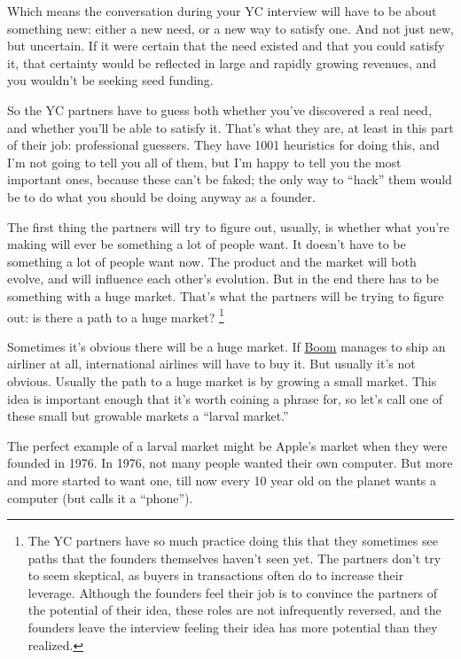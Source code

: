 Which means the conversation during your YC interview will have to be
about something new: either a new need, or a new way to satisfy one. And
not just new, but uncertain. If it were certain that the need existed
and that you could satisfy it, that certainty would be reflected in
large and rapidly growing revenues, and you wouldn't be seeking seed
funding.

So the YC partners have to guess both whether you've discovered a real
need, and whether you'll be able to satisfy it. That's what they are, at
least in this part of their job: professional guessers. They have 1001
heuristics for doing this, and I'm not going to tell you all of them,
but I'm happy to tell you the most important ones, because these can't
be faked; the only way to ``hack'' them would be to do what you should
be doing anyway as a founder.

The first thing the partners will try to figure out, usually, is whether
what you're making will ever be something a lot of people want. It
doesn't have to be something a lot of people want now. The product and
the market will both evolve, and will influence each other's evolution.
But in the end there has to be something with a huge market. That's what
the partners will be trying to figure out: is there a path to a huge
market? \footnote{The YC partners have so much practice doing this that they
sometimes see paths that the founders themselves haven't seen yet. The
partners don't try to seem skeptical, as buyers in transactions often do
to increase their leverage. Although the founders feel their job is to
convince the partners of the potential of their idea, these roles are
not infrequently reversed, and the founders leave the interview feeling
their idea has more potential than they realized.}

Sometimes it's obvious there will be a huge market. If
\href{https://boomsupersonic.com/}{Boom} manages to ship an airliner at
all, international airlines will have to buy it. But usually it's not
obvious. Usually the path to a huge market is by growing a small market.
This idea is important enough that it's worth coining a phrase for, so
let's call one of these small but growable markets a ``larval market.''

The perfect example of a larval market might be Apple's market when they
were founded in 1976. In 1976, not many people wanted their own
computer. But more and more started to want one, till now every 10 year
old on the planet wants a computer (but calls it a ``phone'').

